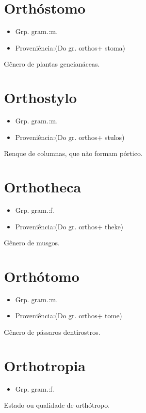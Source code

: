 \section{Orthóstomo}
\begin{itemize}
\item {Grp. gram.:m.}
\end{itemize}
\begin{itemize}
\item {Proveniência:(Do gr. \textunderscore orthos\textunderscore  + \textunderscore stoma\textunderscore )}
\end{itemize}
Gênero de plantas gencianáceas.
\section{Orthostylo}
\begin{itemize}
\item {Grp. gram.:m.}
\end{itemize}
\begin{itemize}
\item {Proveniência:(Do gr. \textunderscore orthos\textunderscore  + \textunderscore stulos\textunderscore )}
\end{itemize}
Renque de columnas, que não formam pórtico.
\section{Orthotheca}
\begin{itemize}
\item {Grp. gram.:f.}
\end{itemize}
\begin{itemize}
\item {Proveniência:(Do gr. \textunderscore orthos\textunderscore  + \textunderscore theke\textunderscore )}
\end{itemize}
Gênero de musgos.
\section{Orthótomo}
\begin{itemize}
\item {Grp. gram.:m.}
\end{itemize}
\begin{itemize}
\item {Proveniência:(Do gr. \textunderscore orthos\textunderscore  + \textunderscore tome\textunderscore )}
\end{itemize}
Gênero de pássaros dentirostros.
\section{Orthotropia}
\begin{itemize}
\item {Grp. gram.:f.}
\end{itemize}
Estado ou qualidade de orthótropo.
